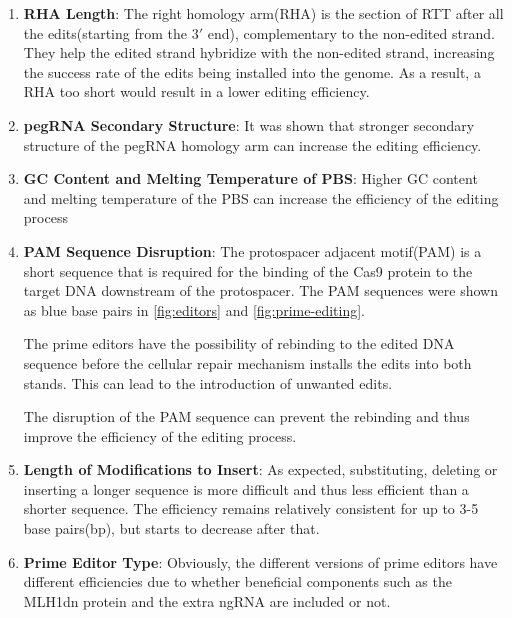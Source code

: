\documentclass[12pt]{article}
\begin{document}
\begin{enumerate}
    \item \textbf{RHA Length}: The right homology arm(RHA) is the section of RTT after all the edits(starting from the $3'$ end), complementary to the non-edited strand. They help the edited strand hybridize with the non-edited strand, increasing the success rate of the edits being installed into the genome. As a result, a RHA too short would result in a lower editing efficiency\cite{yuPredictionEfficienciesDiverse2023}.
    \item \textbf{pegRNA Secondary Structure}: It was shown that stronger secondary structure of the pegRNA homology arm can increase the editing efficiency\cite{koeppelPredictionPrimeEditing2023}.
    \item \textbf{GC Content and Melting Temperature of PBS}: Higher GC content and melting temperature of the PBS can increase the efficiency of the editing process\cite{yuPredictionEfficienciesDiverse2023} 
    \item \textbf{PAM Sequence Disruption}: The protospacer adjacent motif(PAM) is a short sequence that is required for the binding of the Cas9 protein to the target DNA downstream of the protospacer. The PAM sequences were shown as blue base pairs in \autoref{fig:editors} and \autoref{fig:prime-editing}. 
    
    The prime editors have the possibility of rebinding to the edited DNA sequence before the cellular repair mechanism installs the edits into both stands. This can lead to the introduction of unwanted edits. 
    
    The disruption of the PAM sequence can prevent the rebinding and thus improve the efficiency of the editing process\cite{liuPrimeEditingPrecise2023,kimPredictingEfficiencyPrime2021a,koeppelPredictionPrimeEditing2023}.

    \item \textbf{Length of Modifications to Insert}: As expected, substituting, deleting or inserting a longer sequence is more difficult and thus less efficient than a shorter sequence\cite{marquartPredictingBaseEditing2021}. The efficiency remains relatively consistent for up to 3-5 base pairs(bp), but starts to decrease after that\cite{yuPredictionEfficienciesDiverse2023}.
    
    \item \textbf{Prime Editor Type}: Obviously, the different versions of prime editors have different efficiencies due to whether beneficial components such as the MLH1dn protein and the extra ngRNA are included or not.
\end{enumerate}
\end{document}
